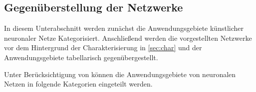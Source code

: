 \subsection{Gegenüberstellung der Netzwerke}
In diesem Unterabschnitt werden zunächst die Anwendungsgebiete künstlicher neuronaler Netze Kategorisiert. Anschließend werden die vorgestellten Netzwerke vor dem Hintergrund der Charakterisierung in \autoref{sec:char} und der Anwendungsgebiete tabellarisch gegenübergestellt.



Unter Berücksichtigung von \citet{Fiesler96} können die Anwendungsgebiete von neuronalen Netzen in folgende Kategorien eingeteilt werden.
